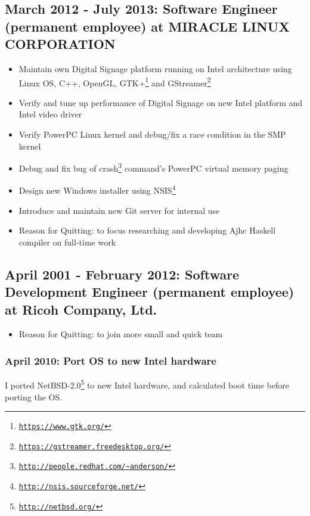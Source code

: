 \documentclass[letterpaper]{article}
\begin{document}
\subsection*{March 2012 - July 2013: Software Engineer (permanent employee) at MIRACLE LINUX CORPORATION}

\begin{itemize}
  \item Maintain own Digital Signage platform running on Intel architecture using Linux OS, C++, OpenGL, GTK+\footnote{\href{https://www.gtk.org/}{\tt https://www.gtk.org/}} and GStreamer\footnote{\href{https://gstreamer.freedesktop.org/}{\tt https://gstreamer.freedesktop.org/}}
  \item Verify and tune up performance of Digital Signage on new Intel platform and Intel video driver
  \item Verify PowerPC Linux kernel and debug/fix a race condition in the SMP kernel
  \item Debug and fix bug of crash\footnote{\href{http://people.redhat.com/{\textasciitilde}anderson/}{\tt http://people.redhat.com/{\textasciitilde}anderson/}} command's PowerPC virtual memory paging
  \item Design new Windows installer using NSIS\footnote{\href{http://nsis.sourceforge.net/}{\tt http://nsis.sourceforge.net/}}
  \item Introduce and maintain new Git server for internal use
  \item Reason for Quitting: to focus researching and developing Ajhc Haskell compiler on full-time work
\end{itemize}

\subsection*{April 2001 - February 2012: Software Development Engineer (permanent employee) at Ricoh Company, Ltd.}

\begin{itemize}
  \item Reason for Quitting: to join more small and quick team
\end{itemize}

\subsubsection*{April 2010: Port OS to new Intel hardware}
I ported NetBSD-2.0\footnote{\href{http://netbsd.org/}{\tt http://netbsd.org/}} to new Intel hardware, and calculated boot time before porting the OS.
\end{document}
